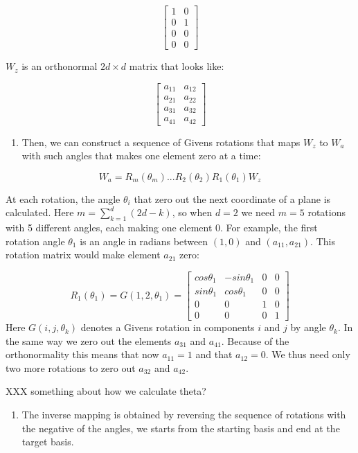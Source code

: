 \[ \begin{bmatrix}1 & 0 \\0  &1 \\ 0&0 \\0&0\end{bmatrix} \]

\(W_z\) is an orthonormal \(2d\times d\) matrix that looks like:

\[ \begin{bmatrix} a_{11} & a_{12} \\a_{21}  &a_{22} \\ a_{31}&a_{32} \\a_{41}&a_{42}\end{bmatrix} \]

\begin{enumerate}
\def\labelenumi{\arabic{enumi}.}
\setcounter{enumi}{2}
\tightlist
\item
  Then, we can construct a sequence of Givens rotations that maps \(W_z\) to \(W_a\) with such angles that makes one element zero at a time:
\end{enumerate}

\[ W_a = R_m(\theta_m) ... R_2(\theta_2)R_1(\theta_1)W_z\]

At each rotation, the angle \(\theta_i\) that zero out the next coordinate of a plane is calculated. Here \(m = \sum_{k=1}^d (2d - k)\), so when \(d=2\) we need \(m=5\) rotations with 5 different angles, each making one element 0. For example, the first rotation angle \(\theta_1\) is an angle in radians between \((1, 0)\) and \((a_{11}, a_{21})\). This rotation matrix would make element \(a_{21}\) zero:

\[R_1(\theta_1) = G(1, 2, \theta_1) = \begin{bmatrix} cos\theta_1 & -sin\theta_1 & 0 & 0 \\sin\theta_1  &cos\theta_1 & 0 &0 \\ 0&0&1&0 \\0&0&0&1\end{bmatrix}\]
Here \(G(i,j,\theta_k)\) denotes a Givens rotation in components \(i\) and \(j\) by angle \(\theta_k\).
In the same way we zero out the elements \(a_{31}\) and \(a_{41}\). Because of the orthonormality this means that now \(a_{11} = 1\) and that \(a_{12} = 0\). We thus need only two more rotations to zero out \(a_{32}\) and \(a_{42}\).

XXX something about how we calculate theta?

\begin{enumerate}
\def\labelenumi{\arabic{enumi}.}
\setcounter{enumi}{3}
\tightlist
\item
  The inverse mapping is obtained by reversing the sequence of rotations with the negative of the angles, we starts from the starting basis and end at the target basis.
\end{enumerate}

